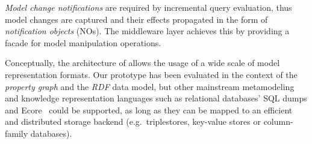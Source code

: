 
\emph{Model change notifications} are required by incremental query evaluation, thus model changes are captured and their effects propagated in the form of \emph{notification objects} (NOs). The middleware layer achieves this by providing a facade for model manipulation operations. 

Conceptually, the architecture of \iqd{} allows the usage of a wide scale of model representation formats. Our prototype has been evaluated in the context of %
the \emph{property graph} and the \emph{RDF} data model, but other mainstream metamodeling and knowledge representation languages such as relational databases' SQL dumps and Ecore~\cite{EMF} could be supported, as long as they can be mapped to an efficient and distributed storage backend (e.g.\ triplestores, key-value stores or column-family databases).

